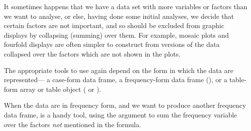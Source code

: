 \documentclass[11pt]{book}\usepackage[]{graphicx}\usepackage[]{color}
\begin{document}
It sometimes happens that we have a data set with more variables or factors than 
we want to analyse, or else, having done some initial analyses, we decide that
certain factors are not important, and so should be excluded from graphic displays
by collapsing (summing) over them.  For example, mosaic plots and fourfold displays
are often simpler to construct from versions of the data collapsed over
the factors which are not shown in the plots.

The appropriate tools to use again depend on
the form in which the data are represented--- a case-form data frame, a
frequency-form data frame (), or a table-form array or 
table object ( or ).

When the data are in frequency form, and we want to produce another
frequency data frame,  is a handy tool, using
the argument  to sum the frequency variable over the 
factors \emph{not} mentioned in the formula.
\end{document}
